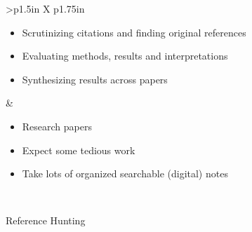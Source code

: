 \documentclass[8pt]{extarticle}
\begin{document}
\begin{tabularx}{\linewidth}{>{\bfseries}p{1.5in} X p{1.75in}}
\begin{minipage}[t]{\linewidth}
                    \begin{whenBox}
                    \begin{itemize}[nosep,leftmargin=*]
                        \item Scrutinizing citations and finding original references
                        \item Evaluating methods, results and interpretations
                        \item Synthesizing results across papers
                    \end{itemize}
                    \end{whenBox}

                \end{minipage}

                    &   \begin{minipage}[t]{\linewidth}
                            \vspace{0pt}

                            \begin{sourcesBox}
                            \begin{itemize}[nosep,leftmargin=*]
                                \item Research papers
                            \end{itemize}
                            \end{sourcesBox}

                            \begin{tipsBox}
                            \begin{itemize}[nosep,leftmargin=*]
                                \item Expect some tedious work
                                \item Take lots of organized searchable (digital) notes
                            \end{itemize}
                            \end{tipsBox}
                        \end{minipage}
                        
                            \\

    \addlinespace %

    \begin{minipage}[t]{\linewidth}
        \vspace{0pt}
        Reference Hunting
    \end{minipage}


\end{tabularx}
\end{document}
